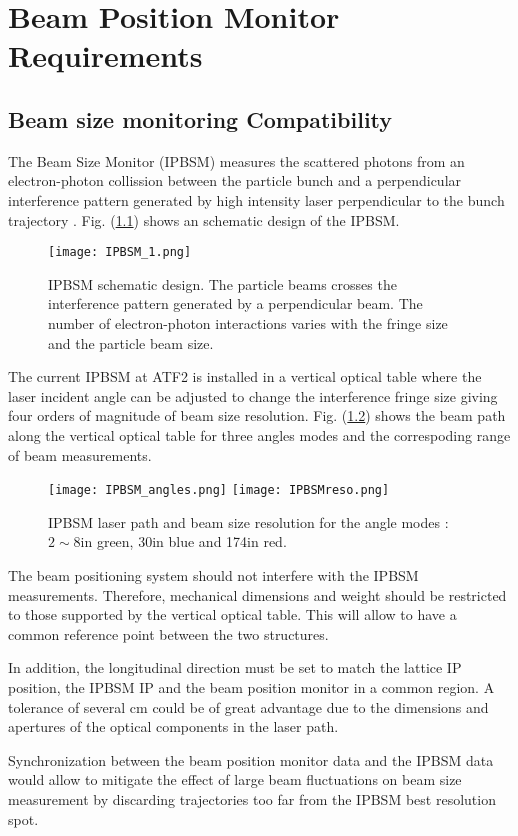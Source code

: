 \chapter{Beam Position Monitor Requirements}
\section{Beam size monitoring Compatibility}
The Beam Size Monitor (IPBSM) measures the scattered photons from an electron-photon collission between the particle bunch and a perpendicular interference pattern generated by high intensity laser perpendicular to the bunch trajectory \cite{Shintake1992453}. Fig. (\ref{f:IPBSM}) shows an schematic design of the IPBSM.
\begin{figure}[htb]
 \begin{center}
  \texttt{[image: IPBSM\_1.png]}\caption{IPBSM schematic design. The particle beams crosses the interference pattern generated by a perpendicular beam. The number of electron-photon interactions varies with the fringe size and the particle beam size.}\label{f:IPBSM}
 \end{center}
\end{figure}
The current IPBSM at ATF2 \cite{Jackelinethese} is installed in a vertical optical table where the laser incident angle can be adjusted to change the interference fringe size giving four orders of magnitude of beam size resolution. Fig. (\ref{f:IPBSMangles}) shows the beam path along the vertical optical table for three angles modes and the correspoding range of beam measurements.\par
\begin{figure}[htb]
 \begin{center}
  \texttt{[image: IPBSM\_angles.png]}
  \texttt{[image: IPBSMreso.png]}
  \caption{IPBSM laser path and beam size resolution for the angle modes : $2\sim8$\degree in green, 30\degree in blue and 174\degree in red.}\label{f:IPBSMangles}
 \end{center}
\end{figure}
The beam positioning system should not interfere with the IPBSM measurements. Therefore, mechanical dimensions and weight should be restricted to those supported by the vertical optical table. This will allow to have a common reference point between the two structures.\par 
In addition, the longitudinal direction must be set to match the lattice IP position, the IPBSM IP and the beam position monitor in a common region. A tolerance of several cm could be of great advantage due to the dimensions and apertures of the optical components in the laser path.\par
Synchronization between the beam position monitor data and the IPBSM data would allow to mitigate the effect of large beam fluctuations on beam size measurement by discarding trajectories too far from the IPBSM best resolution spot.\par

